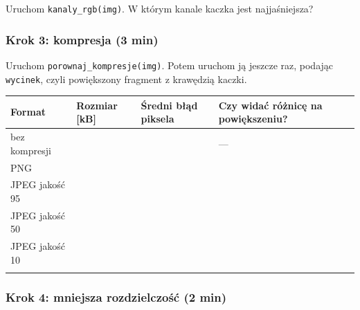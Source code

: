 Uruchom \texttt{kanaly\_rgb(img)}. W którym kanale kaczka jest najjaśniejsza? 

\subsubsection{Krok 3: kompresja (3 min)}\label{krok-3-kompresja-3-min}

Uruchom \texttt{porownaj\_kompresje(img)}. Potem uruchom ją jeszcze raz, podając \texttt{wycinek}, czyli powiększony fragment z krawędzią kaczki.

\par\noindent\begin{minipage}{\linewidth}
\begin{tabular}{@{}
  >{\raggedright\arraybackslash}p{}
  >{\raggedright\arraybackslash}p{}
  >{\raggedright\arraybackslash}p{}
  >{\raggedright\arraybackslash}p{}@{}}
\toprule\noalign{}
\begin{minipage}[b]{\linewidth}\raggedright
Format
\end{minipage} & \begin{minipage}[b]{\linewidth}\raggedright
Rozmiar {[}kB{]}
\end{minipage} & \begin{minipage}[b]{\linewidth}\raggedright
Średni błąd piksela
\end{minipage} & \begin{minipage}[b]{\linewidth}\raggedright
Czy widać różnicę na powiększeniu?
\end{minipage} \\
\midrule\noalign{}
bez kompresji & & 0 & --- \\
PNG & & & \\
JPEG jakość 95 & & & \\
JPEG jakość 50 & & & \\
JPEG jakość 10 & & & \\
\bottomrule\noalign{}
\end{tabular}
\end{minipage}\par\medskip

\subsubsection{Krok 4: mniejsza rozdzielczość (2 min)}\label{krok-4-mniejsza-rozdzielczoux15bux107-2-min}

